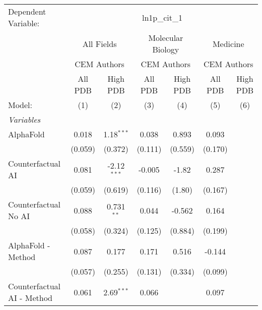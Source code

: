 \begingroup
\centering
\begin{tabular}{lcccccc}
   \tabularnewline \midrule \midrule
   Dependent Variable: & \multicolumn{6}{c}{ln1p\_cit\_1}\\
 & \multicolumn{2}{c}{All Fields} & \multicolumn{2}{c}{Molecular Biology} & \multicolumn{2}{c}{Medicine} \\
\cmidrule(lr){2-3} \cmidrule(lr){4-5} \cmidrule(lr){6-7}
 & \multicolumn{2}{c}{CEM Authors} & \multicolumn{2}{c}{CEM Authors} & \multicolumn{2}{c}{CEM Authors} \\
\cmidrule(lr){2-3} \cmidrule(lr){4-5} \cmidrule(lr){6-7}
 & \multicolumn{1}{c}{All PDB} & \multicolumn{1}{c}{High PDB} & \multicolumn{1}{c}{All PDB} & \multicolumn{1}{c}{High PDB} & \multicolumn{1}{c}{All PDB} & \multicolumn{1}{c}{High PDB} \\
\cmidrule(lr){2-2} \cmidrule(lr){3-3} \cmidrule(lr){4-4} \cmidrule(lr){5-5} \cmidrule(lr){6-6} \cmidrule(lr){7-7}
   Model:                                                     & (1)     & (2)           & (3)     & (4)     & (5)     & (6)\\  
   \midrule
   \emph{Variables}\\
   AlphaFold                                                  & 0.018   & 1.18$^{***}$  & 0.038   & 0.893   & 0.093   &   \\   
                                                              & (0.059) & (0.372)       & (0.111) & (0.559) & (0.170) &   \\   
   Counterfactual AI                                          & 0.081   & -2.12$^{***}$ & -0.005  & -1.82   & 0.287   &   \\   
                                                              & (0.059) & (0.619)       & (0.116) & (1.80)  & (0.167) &   \\   
   Counterfactual No AI                                       & 0.088   & 0.731$^{**}$  & 0.044   & -0.562  & 0.164   &   \\   
                                                              & (0.058) & (0.324)       & (0.125) & (0.884) & (0.199) &   \\   
   AlphaFold - Method                                         & 0.087   & 0.177         & 0.171   & 0.516   & -0.144  &   \\   
                                                              & (0.057) & (0.255)       & (0.131) & (0.334) & (0.099) &   \\   
   Counterfactual AI - Method                                 & 0.061   & 2.69$^{***}$  & 0.066   &         & 0.097   &   \\   

\end{tabular}
